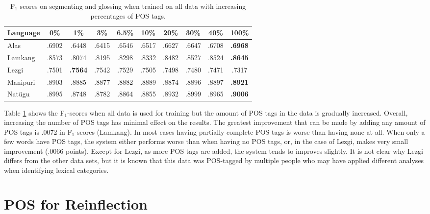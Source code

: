 \begin{table}[]
    \centering
    \begin{tabular}{l|ccccccccc}
       \textbf{Language} & \textbf{0\%} & \textbf{1\%} & \textbf{3\%} & \textbf{6.5\%} & \textbf{10\%} & \textbf{20\%} & \textbf{30\%} & \textbf{40\%} & \textbf{100\%}  \\
       \hline
       Alas  & .6902 & .6448  & .6415 & .6546 & .6517 & .6627 & .6647 & .6708 & \textbf{.6968} \\
       \hline
       Lamkang & .8573 & .8074 & .8195 & .8298 & .8332 & .8482 & .8527 & .8524 & \textbf{.8645}  \\
       \hline
       Lezgi  & .7501 & \textbf{.7564} & .7542 & .7529 & .7505 & .7498 & .7480  & .7471 & .7317 \\
       \hline
       Manipuri & .8903 & .8885 & .8877 & .8882 & .8889 & .8874 & .8896 & .8897 & \textbf{.8921} \\
       \hline
       Nat\"ugu & .8995 & .8748 & .8782 & .8864 & .8855 & .8932 & .8999 & .8965 & \textbf{.9006} \\
    \end{tabular}
    \caption{F$_1$ scores on segmenting and glossing when trained on all data with increasing percentages of POS tags.}
    \label{tab:POSSGpsp}
\end{table}

Table \ref{tab:POSSGpsp} shows the F$_1$-scores when all data is used for training but the amount of POS tags in the data is gradually increased. Overall, increasing the number of POS tags has minimal effect on the results. The greatest improvement that can be made by adding any amount of POS tags is .0072 in F$_1$-scores (Lamkang). In most cases having partially complete POS tags is worse than having none at all. When only a few words have POS tags, the system either performs worse than when having no POS tags, or, in the case of Lezgi, makes very small improvement (.0066 points). Except for Lezgi, as more POS tags are added, the system tends to improves slightly. It is not clear why Lezgi differs from the other data sets, but it is known that this data was POS-tagged by multiple people who may have applied different analyses when identifying lexical categories.


\section{POS for Reinflection}
\label{sec:inflection}

